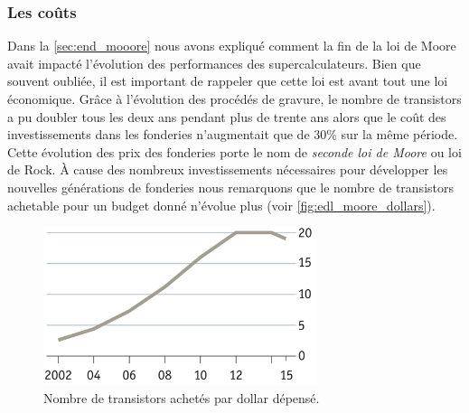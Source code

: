     \subsubsection{Les coûts}\label{sec:edl_chal_prix}

    
        Dans la \autoref{sec:end_mooore} nous avons expliqué comment la fin de la loi de Moore avait impacté l'évolution des performances des supercalculateurs. Bien que souvent oubliée, il est important de rappeler que cette loi est avant tout une loi économique.
        Grâce à l'évolution des procédés de gravure, le nombre de transistors a pu doubler tous les deux ans pendant plus de trente ans alors que le coût des investissements dans les fonderies n'augmentait que de 30\% sur la même période. Cette évolution des prix des fonderies porte le nom de \textit{seconde loi de Moore} ou loi de Rock. À cause des nombreux investissements nécessaires pour développer les nouvelles générations de fonderies nous remarquons que le nombre de transistors achetable pour un budget donné n'évolue plus (voir \autoref{fig:edl_moore_dollars}).
    
        \begin{figure}
        \center
        \includegraphics[width=8cm]{images/edl_moore_dollars.png}
        \caption{\label{fig:edl_moore_dollars} Nombre de transistors achetés par dollar dépensé\protect\footnotemark.}
        \end{figure}

    

